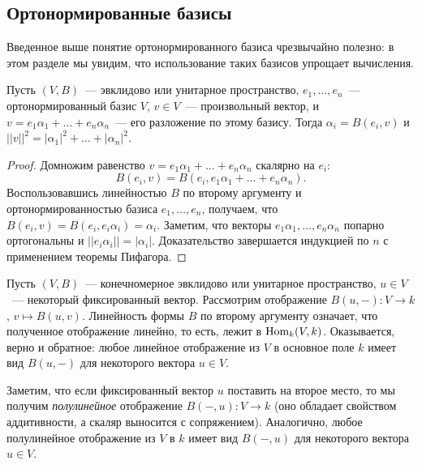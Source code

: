 \subsection{Ортонормированные базисы}

Введенное выше понятие ортонормированного базиса чрезвычайно полезно:
в этом разделе мы увидим, что использование таких базисов упрощает вычисления.

\begin{lemma}\label{lem:orthonormal-basis-coordinates}
Пусть $(V,B)$~--- эвклидово или унитарное пространство,
$e_1,\dots,e_n$~--- ортонормированный базис $V$,
$v\in V$~--- произвольный вектор, и $v = e_1\alpha_1 + \dots + e_n\alpha_n$~---
его разложение по этому базису.
Тогда $\alpha_i = B(e_i,v)$ и
$||v||^2 = |\alpha_1|^2 + \dots + |\alpha_n|^2$.
\end{lemma}
\begin{proof}
Домножим равенство $v = e_1\alpha_1 + \dots + e_n\alpha_n$
скалярно на $e_i$:
$$
B(e_i,v) = B(e_i, e_1\alpha_1 + \dots + e_n\alpha_n).
$$
Воспользовавшись линейностью $B$ по второму аргументу и ортонормированностью
базиса $e_1,\dots,e_n$, получаем, что $B(e_i,v) = B(e_i,e_i\alpha_i) = \alpha_i$.
Заметим, что векторы $e_1\alpha_1,\dots,e_n\alpha_n$ попарно ортогональны и
$||e_i\alpha_i|| = |\alpha_i|$. Доказательство завершается индукцией по $n$
с применением теоремы Пифагора.
\end{proof}

Пусть $(V,B)$~--- конечномерное эвклидово или унитарное пространство,
$u\in V$~--- некоторый фиксированный вектор. Рассмотрим отображение
$B(u,{-})\colon V\to k$, $v\mapsto B(u,v)$. Линейность формы $B$ по второму
аргументу означает, что полученное отображение линейно, то есть,
лежит в $\operatorname{Hom}_k(V,k)$. Оказывается, верно и обратное: любое линейное отображение
из $V$ в основное поле $k$ имеет вид $B(u,{-})$ для некоторого вектора $u\in V$.

Заметим, что если фиксированный вектор $u$ поставить на второе место, то
мы получим {\em полулинейное} отображение $B({-},u)\colon V\to k$
(оно обладает свойством аддитивности, а скаляр выносится с сопряжением). Аналогично,
любое полулинейное отображение из $V$ в $k$ имеет вид $B({-},u)$
для некоторого вектора $u\in V$.

